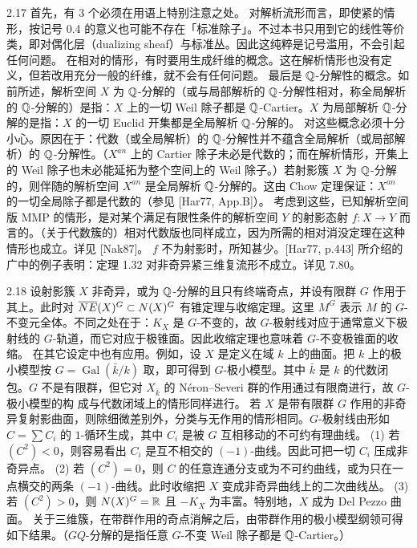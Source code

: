 \begin{example}[解析的情形]{2.17}
首先，有 3 个必须在用语上特别注意之处。
对解析流形而言，即使紧的情形，按记号 0.4 的意义也可能不存在「标准除子」。不过本书只用到它的线性等价类，即对偶化层（dualizing sheaf）与标准丛。因此这纯粹是记号滥用，不会引起任何问题。
在相对的情形，有时要用生成纤维的概念。这在解析情形也没有定义，但若改用充分一般的纤维，就不会有任何问题。
最后是 $\mathbb{Q}$-分解性的概念。如前所述，解析空间 $X$
为 $\mathbb{Q}$-分解的（或与局部解析的 $\mathbb{Q}$-分解性相对，称全局解析的 $\mathbb{Q}$-分解的）是指：$X$ 上的一切 Weil 除子都是 $\mathbb{Q}$-Cartier。$X$ 为局部解析 $\mathbb{Q}$-分解的是指：$X$ 的一切 Euclid 开集都是全局解析 $\mathbb{Q}$-分解的。
对这些概念必须十分小心。原因在于：代数（或全局解析）的 $\mathbb{Q}$-分解性并不蕴含全局解析（或局部解析）的 $\mathbb{Q}$-分解性。（$X^{an}$ 上的 Cartier 除子未必是代数的；而在解析情形，开集上的 Weil 除子也未必能延拓为整个空间上的 Weil 除子。）若射影簇 $X$ 为 $\mathbb{Q}$-分解的，则伴随的解析空间 $X^{an}$ 是全局解析 $\mathbb{Q}$-分解的。这由 Chow 定理保证：$X^{an}$ 的一切全局除子都是代数的（参见 [Har77, App.B]）。
考虑到这些，已知解析空间版 MMP 的情形，是对某个满足有限性条件的解析空间 $Y$ 的射影态射 $f\colon X\to Y$ 而言的。（关于代数簇的）相对代数版也同样成立，因为所需的相对消没定理在这种情形也成立。详见 [Nak87]。
$f$ 不为射影时，所知甚少。[Har77, p.443] 所介绍的广中的例子表明：定理 1.32 对非奇异紧三维复流形不成立。详见 7.80。
\end{example}


\begin{examplep}[带群作用的簇]{2.18}
设射影簇 $X$ 非奇异，或为 $\mathbb{Q}$-分解的且只有终端奇点，并设有限群 $G$ 作用于其上。此时对 $\overline{NE}(X)^G\subset N(X)^G$ 有锥定理与收缩定理。这里 $M^G$ 表示 $M$ 的 $G$-不变元全体。不同之处在于：$K_X$ 是 $G$-不变的，故 $G$-极射线对应于通常意义下极射线的 $G$-轨道，而它对应于极锥面。因此收缩定理也意味着 $G$-不变极锥面的收缩。
在其它设定中也有应用。例如，设 $X$ 是定义在域 $k$ 上的曲面。把 $k$ 上的极小模型按 $G=\operatorname{Gal}(\bar k/k)$ 取，即可得到 $G$-极小模型。其中 $\bar k$ 是 $k$ 的代数闭包。$G$ 不是有限群，但它对 $X_{\bar k}$ 的 Néron--Severi 群的作用通过有限商进行，故 $G$-极小模型的构
成与代数闭域上的情形同样进行。
若 $X$ 是带有限群 $G$ 作用的非奇异复射影曲面，则除细微差别外，分类与无作用的情形相同。$G$-极射线由形如 $C=\sum C_i$ 的 $1$-循环生成，其中 $C_i$ 是被 $G$ 互相移动的不可约有理曲线。
(1) 若 $(C^2)<0$，则容易看出 $C_i$ 是互不相交的 $(-1)$-曲线。因此可把一切 $C_i$ 压成非奇异点。
(2) 若 $(C^2)=0$，则 $C$ 的任意连通分支或为不可约曲线，或为只在一点横交的两条 $(-1)$-曲线。此时收缩把 $X$ 变成非奇异曲线上的二次曲线丛。
(3) 若 $(C^2)>0$，则 $N(X)^G=\mathbb{R}$ 且 $-K_X$ 为丰富。特别地，$X$ 成为 Del Pezzo 曲面。
关于三维簇，在带群作用的奇点消解之后，由带群作用的极小模型纲领可得如下结果。（$GQ$-分解的是指任意 $G$-不变 Weil 除子都是 $\mathbb{Q}$-Cartier。）
\end{examplep}

